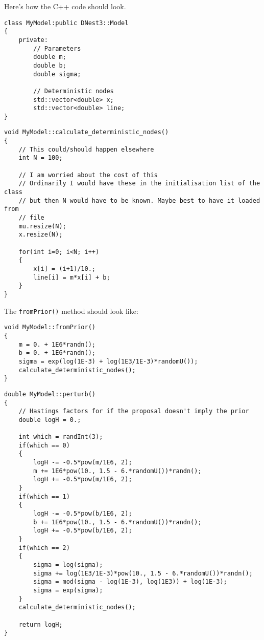 \documentclass[letterpaper, 11pt]{article}
\begin{document}
Here's how the C++ code should look.

\begin{verbatim}
class MyModel:public DNest3::Model
{
    private:
        // Parameters
        double m;
        double b;
        double sigma;

        // Deterministic nodes
        std::vector<double> x;
        std::vector<double> line;
}
\end{verbatim}

\begin{verbatim}
void MyModel::calculate_deterministic_nodes()
{
    // This could/should happen elsewhere
    int N = 100;

    // I am worried about the cost of this
    // Ordinarily I would have these in the initialisation list of the class
    // but then N would have to be known. Maybe best to have it loaded from
    // file
    mu.resize(N);
    x.resize(N);

    for(int i=0; i<N; i++)
    {
        x[i] = (i+1)/10.;
        line[i] = m*x[i] + b;
    }
}
\end{verbatim}
The {\tt fromPrior()} method should look like:
\begin{verbatim}
void MyModel::fromPrior()
{
    m = 0. + 1E6*randn();
    b = 0. + 1E6*randn();
    sigma = exp(log(1E-3) + log(1E3/1E-3)*randomU());
    calculate_deterministic_nodes();
}
\end{verbatim}


\begin{verbatim}
double MyModel::perturb()
{
    // Hastings factors for if the proposal doesn't imply the prior
    double logH = 0.;

    int which = randInt(3);
    if(which == 0)
    {
        logH -= -0.5*pow(m/1E6, 2);
        m += 1E6*pow(10., 1.5 - 6.*randomU())*randn();
        logH += -0.5*pow(m/1E6, 2);
    }
    if(which == 1)
    {
        logH -= -0.5*pow(b/1E6, 2);
        b += 1E6*pow(10., 1.5 - 6.*randomU())*randn();
        logH += -0.5*pow(b/1E6, 2);
    }
    if(which == 2)
    {
        sigma = log(sigma);
        sigma += log(1E3/1E-3)*pow(10., 1.5 - 6.*randomU())*randn();
        sigma = mod(sigma - log(1E-3), log(1E3)) + log(1E-3);
        sigma = exp(sigma);
    }
    calculate_deterministic_nodes();

    return logH;
}
\end{verbatim}
\end{document}
